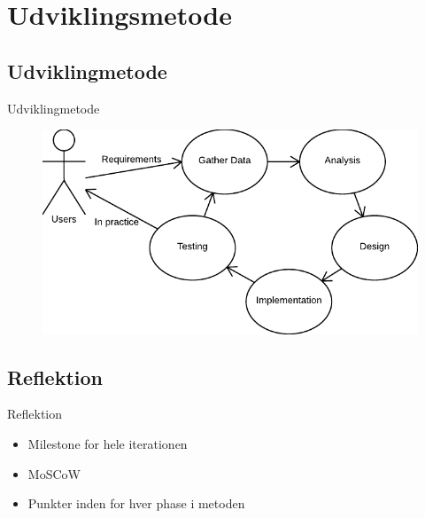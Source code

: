\section{Udviklingsmetode}

\subsection{Udviklingmetode}
\begin{frame}{Udviklingmetode}
  \begin{figure}
    \centering
    \includegraphics{slides/Heider/Developmentprocess}
  \end{figure}
\end{frame}
\subsection{Reflektion}
\begin{frame}{Reflektion}
  \begin{itemize}
    \item Milestone for hele iterationen
    \item MoSCoW
    \item Punkter inden for hver phase i metoden
  \end{itemize}
\end{frame}
